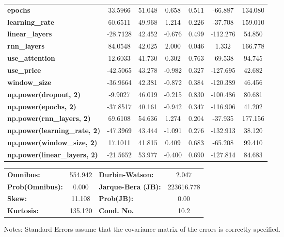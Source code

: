 \begin{center}
\begin{tabular}{lcccccc}
\textbf{epochs}                            &      33.5966  &       51.048     &     0.658  &         0.511        &      -66.887    &      134.080     \\
\textbf{learning\_rate}                    &      60.6511  &       49.968     &     1.214  &         0.226        &      -37.708    &      159.010     \\
\textbf{linear\_layers}                    &     -28.7128  &       42.452     &    -0.676  &         0.499        &     -112.276    &       54.850     \\
\textbf{rnn\_layers}                       &      84.0548  &       42.025     &     2.000  &         0.046        &        1.332    &      166.778     \\
\textbf{use\_attention}                    &      12.6033  &       41.730     &     0.302  &         0.763        &      -69.538    &       94.745     \\
\textbf{use\_price}                        &     -42.5065  &       43.278     &    -0.982  &         0.327        &     -127.695    &       42.682     \\
\textbf{window\_size}                      &     -36.9664  &       42.381     &    -0.872  &         0.384        &     -120.389    &       46.456     \\
\textbf{np.power(dropout, 2)}              &      -9.9027  &       46.019     &    -0.215  &         0.830        &     -100.486    &       80.681     \\
\textbf{np.power(epochs, 2)}               &     -37.8517  &       40.161     &    -0.942  &         0.347        &     -116.906    &       41.202     \\
\textbf{np.power(rnn\_layers, 2)}          &      69.6108  &       54.636     &     1.274  &         0.204        &      -37.935    &      177.156     \\
\textbf{np.power(learning\_rate, 2)}       &     -47.3969  &       43.444     &    -1.091  &         0.276        &     -132.913    &       38.120     \\
\textbf{np.power(window\_size, 2)}         &      17.1011  &       41.815     &     0.409  &         0.683        &      -65.208    &       99.410     \\
\textbf{np.power(linear\_layers, 2)}       &     -21.5652  &       53.977     &    -0.400  &         0.690        &     -127.814    &       84.683     \\
\bottomrule
\end{tabular}
\begin{tabular}{lclc}
\textbf{Omnibus:}       & 554.942 & \textbf{  Durbin-Watson:     } &     2.047   \\
\textbf{Prob(Omnibus):} &   0.000 & \textbf{  Jarque-Bera (JB):  } & 223616.778  \\
\textbf{Skew:}          &  11.108 & \textbf{  Prob(JB):          } &      0.00   \\
\textbf{Kurtosis:}      & 135.120 & \textbf{  Cond. No.          } &      10.2   \\
\bottomrule
\end{tabular}
\end{center}

Notes: \newline
 [1] Standard Errors assume that the covariance matrix of the errors is correctly specified.